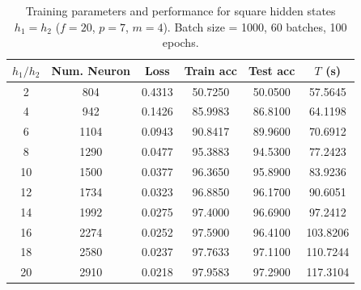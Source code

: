 \begin{table}[htbp]
\centering
\caption{Training parameters and performance for square hidden states $h_1=h_2$ ($f=20$, $p=7$, $m=4$). Batch size = 1000, 60 batches, 100 epochs.}
\label{tab:hidden_state_performance}
\begin{tabular}{cccccc}
\toprule
$h_1/h_2$ & Num. Neuron & Loss    & Train acc & Test acc & $T$ (s) \\
\midrule
2      & 804  & 0.4313 & 50.7250 &50.0500 & 57.5645  \\
4      & 942  & 0.1426 & 85.9983 &86.8100 & 64.1198  \\
6      & 1104  & 0.0943 & 90.8417 &89.9600 & 70.6912  \\
8      & 1290  & 0.0477 & 95.3883 &94.5300 & 77.2423  \\
10      & 1500  & 0.0377 & 96.3650 &95.8900 & 83.9236  \\
12      & 1734  & 0.0323 & 96.8850 &96.1700 & 90.6051  \\
14      & 1992  & 0.0275 & 97.4000 &96.6900 & 97.2412  \\
16      & 2274  & 0.0252 & 97.5900 &96.4100 & 103.8206  \\
18      & 2580  & 0.0237 & 97.7633 &97.1100 & 110.7244  \\
20      & 2910  & 0.0218 & 97.9583 &97.2900 & 117.3104  \\
\bottomrule
\end{tabular}%
\end{table}
